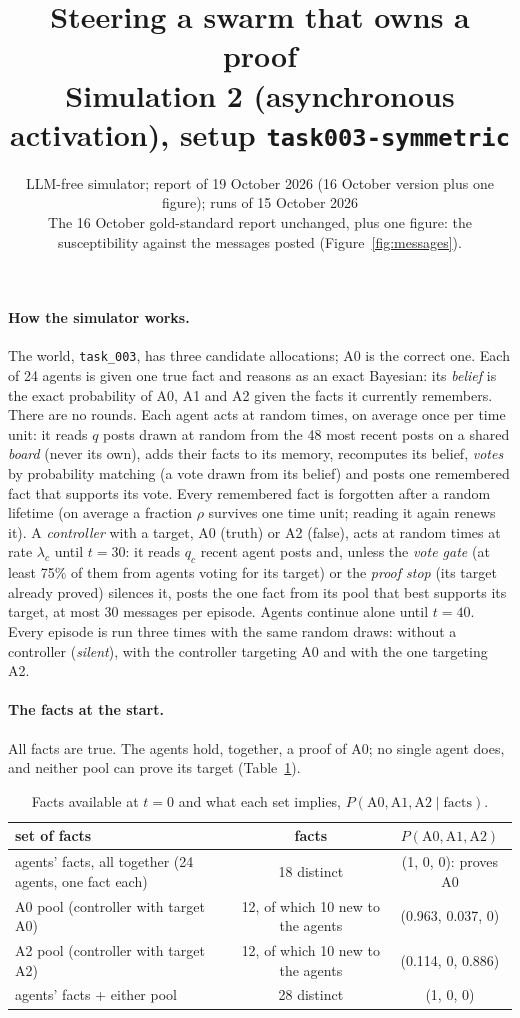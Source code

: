 \documentclass[10pt,a4paper]{article}
\title{\vspace{-1.2cm}\textbf{Steering a swarm that owns a proof}\\[2pt]
\large Simulation 2 (asynchronous activation), setup \texttt{task003-symmetric}}
\author{LLM-free simulator; report of 19 October 2026 (16 October version plus one figure); runs of 15 October 2026\\
\small The 16 October gold-standard report unchanged, plus one figure: the susceptibility against the messages posted
(Figure~\ref{fig:messages}).}
\date{}
\begin{document}
\maketitle
\vspace{-1cm}

\paragraph{How the simulator works.} The world, \texttt{task\_003}, has three candidate allocations; A0 is the
correct one. Each of 24 agents is given one true fact and reasons as an exact Bayesian: its \emph{belief} is the
exact probability of A0, A1 and A2 given the facts it currently remembers. There are no rounds. Each agent acts
at random times, on average once per time unit: it reads $q$ posts drawn at random from the 48 most recent posts
on a shared \emph{board} (never its own), adds their facts to its memory, recomputes its belief, \emph{votes} by
probability matching (a vote drawn from its belief) and posts one remembered fact that supports its vote. Every
remembered fact is forgotten after a random lifetime (on average a fraction $\rho$ survives one time unit; reading
it again renews it). A \emph{controller} with a target, A0 (truth) or A2 (false), acts at random times at rate
$\lambda_c$ until $t = 30$: it reads $q_c$ recent agent posts and, unless the \emph{vote gate} (at least 75\% of
them from agents voting for its target) or the \emph{proof stop} (its target already proved) silences it, posts
the one fact from its pool that best supports its target, at most 30 messages per episode. Agents continue
alone until $t = 40$. Every episode is run three times with the same random draws: without a controller
(\emph{silent}), with the controller targeting A0 and with the one targeting A2.

\paragraph{The facts at the start.} All facts are true. The agents hold, together, a proof of A0; no single
agent does, and neither pool can prove its target (Table~\ref{tab:facts}).

\begin{table}[H]
\centering\small
\caption{Facts available at $t = 0$ and what each set implies, $P(\text{A0}, \text{A1}, \text{A2} \mid \text{facts})$.}
\label{tab:facts}
\begin{tabular}{lcc}
\toprule
set of facts & facts & $P(\text{A0}, \text{A1}, \text{A2})$ \\
\midrule
agents' facts, all together (24 agents, one fact each) & 18 distinct & (1, 0, 0): proves A0 \\
A0 pool (controller with target A0) & 12, of which 10 new to the agents & (0.963, 0.037, 0) \\
A2 pool (controller with target A2) & 12, of which 10 new to the agents & (0.114, 0, 0.886) \\
agents' facts + either pool & 28 distinct & (1, 0, 0) \\
\bottomrule
\end{tabular}
\end{table}
\end{document}
